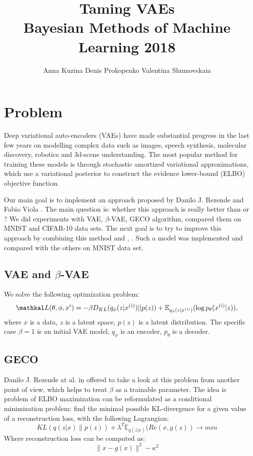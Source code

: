 \documentclass{article}
\title{Taming VAEs\\
\normalsize{Bayesian Methods of Machine Learning 2018}}
\author{
  Anna Kuzina   
    \And
  Denis Prokopenko
    \And
  Valentina Shumovskaia
}
\begin{document}
\maketitle

\section{Problem}

Deep variational auto-encoders (VAEs) have made substantial progress in the last few years on modelling complex data such as images, speech synthesis, molecular discovery, robotics and 3d-scene understanding. The most popular method for training these models is through stochastic amortized variational approximations, which use a variational posterior to construct the evidence lower-bound (ELBO) objective function.

Our main goal is to implement an approach proposed by Danilo J. Rezende and  Fabio Viola \cite{taming}. The main question is: whether this approach is really better than \cite{vae} or \cite{betavae}? We did experiments with VAE, $\beta$-VAE, GECO algorithm, compared them on MNIST and CIFAR-10 data sets. The next goal is to try to improve this approach by combining this method and \cite{iwae1}, \cite{iwae2}. Such a model was implemented and compared with the others on MNIST data set.

\subsection{VAE and $\beta$-VAE}

We solve the following optimization problem:
\begin{equation}\label{eq:VAE}
    \mathkal L(\theta, \phi, x^{i}) = -\beta D_{KL}(q_{\phi}(z|x^{(i)})||p(z)) + \mathbb E_{q_{\phi}(z|x^{(i)})}(\log p_\theta (x^{(i)}|z)),
\end{equation}
where $x$ is a data, $z$ is a latent space, $p(z)$ is a latent distribution. The specific case $\beta = 1$ is an initial VAE model, $q_{\phi}$ is an encoder, $p_\theta$ is a decoder.

\subsection{GECO}
Danilo J. Rezende at al. in \cite{taming} offered to take a look at this problem from another point of view, which helps to treat $\beta$ as a trainable parameter. The idea is problem of ELBO maximization can be reformulated as a conditional minimization problem: find the minimal possible KL-divergence for a given value of a reconstruction loss, with the following Lagrangian:
\begin{equation}\label{eq:Lagrangian}
    KL(q(z|x)\|p(z)) + \lambda^T \mathbb{E}_{q(z|x)}(Re(x, g(z)) \rightarrow min
\end{equation}
Where reconstruction loss can be computed as:
\begin{equation*}
    \|x - g(x)\|^2 - \kappa^2
\end{equation*}
\end{document}
